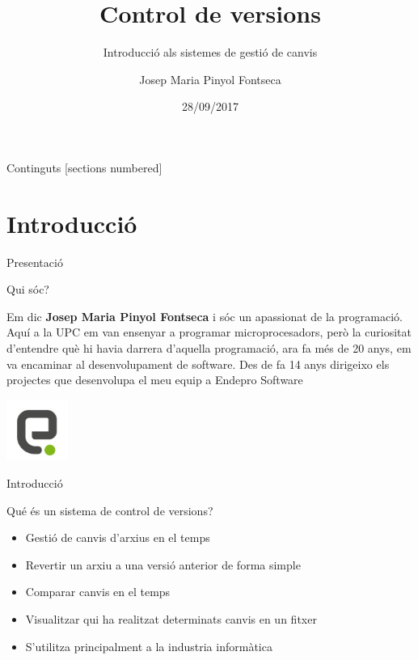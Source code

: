 \documentclass[10pt,xcolor={rgb}]{beamer}
\title{Control de versions}
\subtitle{Introducció als sistemes de gestió de canvis}
\date{28/09/2017}
\author{Josep Maria Pinyol Fontseca}
\institute{Endepro Software, S.L.}
\begin{document}
    \maketitle
    
    \begin{frame}{Continguts}
      [sections numbered]
      \tableofcontents[hideallsubsections]
    \end{frame}
    
    
    \section{Introducció}    
    
    \begin{frame}[fragile]{Presentació}

      \begin{block}{Qui sóc?}

        Em dic \textbf{Josep Maria Pinyol Fontseca} i sóc un apassionat de la programació. Aquí a la UPC em van ensenyar a programar microprocesadors, però la curiositat d’entendre què hi havia darrera d’aquella programació, ara fa més de 20 anys, em va encaminar al desenvolupament de software. Des de fa 14 anys dirigeixo els projectes que desenvolupa el meu equip a Endepro Software

        \centering
        \includegraphics[width=2cm, height=2cm]{endepro.png}
      \end{block}

    \end{frame}


    \begin{frame}[fragile]{Introducció}

      \begin{block}{Qué és un sistema de control de versions?}
        \begin{itemize}
          \item Gestió de canvis d'arxius en el temps
          \item Revertir un arxiu a una versió anterior de forma simple
          \item Comparar canvis en el temps
          \item Visualitzar qui ha realitzat determinats canvis en un fitxer
          \item S'utilitza principalment a la industria informàtica
        \end{itemize}
      \end{block}
      
    \end{frame}
\end{document}
